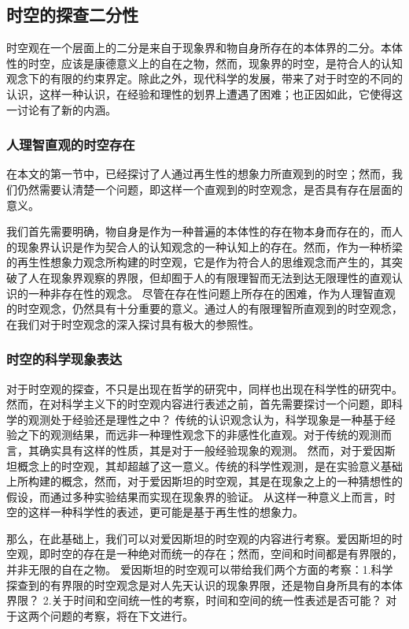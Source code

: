 \documentclass[lang=cn,11pt]{elegantpaper}
\begin{document}
\subsection{时空的探查二分性}
 时空观在一个层面上的二分是来自于现象界和物自身所存在的本体界的二分。本体性的时空，应该是康德意义上的自在之物，然而，现象界的时空，是符合人的认知观念下的有限的约束界定。除此之外，现代科学的发展，带来了对于时空的不同的认识，这样一种认识，在经验和理性的划界上遭遇了困难；也正因如此，它使得这一讨论有了新的内涵。

\subsubsection{人理智直观的时空存在}
在本文的第一节中，已经探讨了人通过再生性的想象力所直观到的时空；然而，我们仍然需要认清楚一个问题，即这样一个直观到的时空观念，是否具有存在层面的意义。

我们首先需要明确，物自身是作为一种普遍的本体性的存在物本身而存在的，而人的现象界认识是作为契合人的认知观念的一种认知上的存在。然而，作为一种桥梁的再生性想象力观念所构建的时空观，它是作为符合人的思维观念而产生的，其突破了人在现象界观察的界限，但却囿于人的有限理智而无法到达无限理性的直观认识的一种非存在性的观念。
尽管在存在性问题上所存在的困难，作为人理智直观的时空观念，仍然具有十分重要的意义。通过人的有限理智所直观到的时空观念，在我们对于时空观念的深入探讨具有极大的参照性。

\subsubsection{时空的科学现象表达}
对于时空观的探查，不只是出现在哲学的研究中，同样也出现在科学性的研究中。然而，在对科学主义下的时空观内容进行表述之前，首先需要探讨一个问题，即科学的观测处于经验还是理性之中？
传统的认识观念认为，科学现象是一种基于经验之下的观测结果，而远非一种理性观念下的非感性化直观。对于传统的观测而言，其确实具有这样的性质，其是对于一般经验现象的观测。
然而，对于爱因斯坦概念上的时空观，其却超越了这一意义。传统的科学性观测，是在实验意义基础上所构建的概念，然而，对于爱因斯坦的时空观，其是在现象之上的一种猜想性的假设，而通过多种实验结果而实现在现象界的验证。
从这样一种意义上而言，时空的这样一种科学性的表述，更可能是基于再生性的想象力。

那么，在此基础上，我们可以对爱因斯坦的时空观的内容进行考察。爱因斯坦的时空观，即时空的存在是一种绝对而统一的存在；然而，空间和时间都是有界限的，并非无限的自在之物。
爱因斯坦的时空观可以带给我们两个方面的考察：1.科学探查到的有界限的时空观念是对人先天认识的现象界限，还是物自身所具有的本体界限？ 2.关于时间和空间统一性的考察，时间和空间的统一性表述是否可能？
对于这两个问题的考察，将在下文进行。
\end{document}
